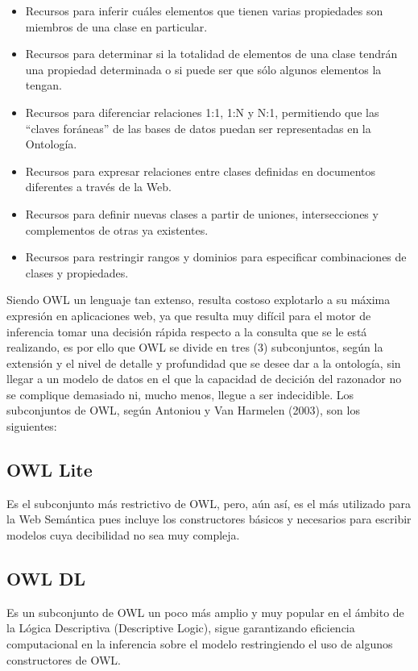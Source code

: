 \begin{itemize}
\item Recursos para inferir cuáles elementos que tienen varias propiedades son miembros de una clase en particular.
\item Recursos para determinar si la totalidad de elementos de una clase tendrán una propiedad determinada o si puede ser que sólo algunos elementos la tengan.
\item Recursos para diferenciar relaciones 1:1, 1:N y N:1, permitiendo que las ``claves foráneas'' de las bases de datos puedan ser representadas en la Ontología.
\item Recursos para expresar relaciones entre clases definidas en documentos diferentes a través de la Web.
\item Recursos para definir nuevas clases a partir de uniones, intersecciones y complementos de otras ya existentes.
\item Recursos para restringir rangos y dominios para especificar combinaciones de clases y propiedades.
\end{itemize}

Siendo OWL un lenguaje tan extenso, resulta costoso explotarlo a su máxima expresión en aplicaciones web, ya que resulta muy difícil para el motor de inferencia tomar una decisión rápida respecto a la consulta que se le está realizando, es por ello que OWL se divide en tres (3) subconjuntos, según la extensión y el nivel de detalle y profundidad que se desee dar a la ontología, sin llegar a un modelo de datos en el que la capacidad de decición del razonador no se complique demasiado ni, mucho menos, llegue a ser indecidible. Los subconjuntos de OWL, según Antoniou y Van Harmelen (2003), son los siguientes:

\subsection{OWL Lite}
Es el subconjunto más restrictivo de OWL, pero, aún así, es el más utilizado para la Web Semántica pues incluye los constructores básicos y necesarios para escribir modelos cuya decibilidad no sea muy compleja.
\subsection{OWL DL}
Es un subconjunto de OWL un poco más amplio y muy popular en el ámbito de la Lógica Descriptiva (Descriptive Logic), sigue garantizando eficiencia computacional en la inferencia sobre el modelo restringiendo el uso de algunos constructores de OWL.


